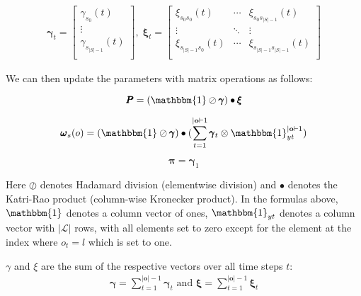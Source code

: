 \begin{align}
\pmb{\gamma}_t = 
    \begin{bmatrix}
        \gamma_{s_0}(t)       \\
        \vdots                \\
        \gamma_{s_{|S|-1}}(t) \\
    \end{bmatrix}, \;
\pmb{\xi}_t = 
    \begin{bmatrix}
        \xi_{s_0 s_0}(t)      & \cdots & \xi_{s_0 s_{|S|-1}}(t)      \\
        \vdots                & \ddots & \vdots                      \\
        \xi_{s_{|S|-1}s_0}(t) & \cdots & \xi_{s_{|S|-1}s_{|S|-1}}(t) \\
    \end{bmatrix}
\end{align}

We can then update the parameters with matrix operations as follows:

\begin{equation}
\pmb{P}
    = (\mathbbm{1} \oslash \pmb{\gamma}) \bullet \pmb{\xi}
    \label{eq:transition-probabilities-update}
\end{equation}

\begin{equation}
\pmb{\omega}
    _s(o) = (\mathbbm{1} \oslash \pmb{\gamma}) \bullet (\sum_{t=1}^{|\mathbf{o}|-1} \pmb{\gamma}_t \otimes \mathbbm{1}_{yt}^{|\mathbf{o}|-1})
    \label{eq:omega-update}
\end{equation}

\begin{equation}
\pmb{\pi}
    = \pmb{\gamma}_1
    \label{eq:initial-probabilities-update}
\end{equation}

Here $\oslash$ denotes Hadamard division (elementwise division) and $\bullet$ denotes the Katri-Rao product (column-wise Kronecker product).
In the formulas above, $\mathbbm{1}$ denotes a column vector of ones, $\mathbbm{1}_{yt}$ denotes a column vector with $|\mathcal{L}|$ rows, with all elements set to zero except for the element at the index where $o_t = l$ which is set to one.

$\gamma$ and $\xi$ are the sum of the respective vectors over all time steps $t$:
\begin{align}
    \pmb{\gamma} = \sum_{t=1}^{|\mathbf{o}|-1} \pmb{\gamma}_t 
    \text{ and } 
    \pmb{\xi} = \sum_{t=1}^{|\mathbf{o}|-1} \pmb{\xi}_t
\end{align} 

